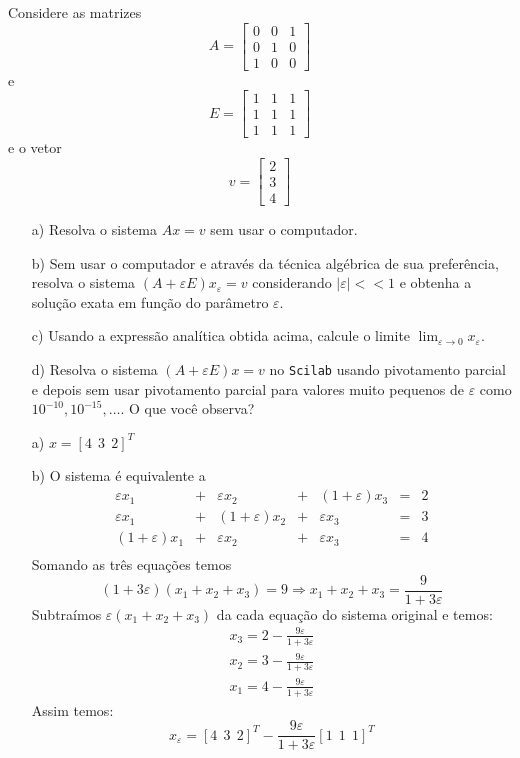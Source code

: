 \ifisscilab
\begin{Exercise} Considere as matrizes
$$A=
\left[
\begin{array}{ccc}
0&0&1\\
0&1&0\\
1&0&0
\end{array}\right]$$
e
$$E=
\left[
\begin{array}{ccc}
1&1&1\\
1&1&1\\
1&1&1
\end{array}\right]$$
e o vetor
$$v=
\left[
\begin{array}{c}
2\\
3\\
4
\end{array}\right]$$
\begin{itemize}
\item[a)] Resolva o sistema $Ax=v$ sem usar o computador.
\item[b)] Sem usar o computador e através da técnica algébrica de sua preferência, resolva o sistema $(A+\varepsilon E)x_\varepsilon=v$ considerando $|\varepsilon|<<1$ e obtenha a solução exata em função do parâmetro $\varepsilon$.
\item[c)] Usando a expressão analítica obtida acima, calcule o limite $\lim_{\varepsilon\to 0} x_\varepsilon $.
\item[d)] Resolva o sistema $(A+\varepsilon E)x=v$ no \verb+Scilab+ usando pivotamento parcial e depois sem usar pivotamento parcial para valores muito pequenos de $\varepsilon$ como $10^{-10}, 10^{-15}, \ldots$. O que você observa?
\end{itemize}
\end{Exercise}
\begin{Answer}
  \begin{tiny}
\begin{itemize}
\item[a)] $x=[4 ~~3 ~~2]^T$

\item[b)] O sistema é equivalente a
$$
\begin{array}{lclclcl}
\varepsilon x_1 &+& \varepsilon x_2 &+&(1+\varepsilon) x_3 &=& 2\\
\varepsilon x_1 &+& (1+\varepsilon) x_2 &+&\varepsilon x_3 &=& 3\\
(1+\varepsilon) x_1 &+& \varepsilon x_2 &+&\varepsilon x_3 &=& 4\\
\end{array}
$$
Somando as três equações temos
$$(1+3\varepsilon)(x_1+x_2+x_3)=9\Longrightarrow x_1+x_2+x_3=\frac{9}{1+3\varepsilon}$$
Subtraímos $\varepsilon(x_1+x_2+x_3)$ da cada equação do sistema original e temos:
$$\begin{array}{l}
x_3=2-\frac{9\varepsilon}{1+3\varepsilon}\\[.4cm]
x_2=3-\frac{9\varepsilon}{1+3\varepsilon}\\[.4cm]
x_1=4-\frac{9\varepsilon}{1+3\varepsilon}
\end{array}
$$
Assim temos:
$$x_{\varepsilon}=\left[4 ~~3 ~~2\right]^T-\frac{9\varepsilon}{1+3\varepsilon}\left[1 ~~1 ~~1\right]^T$$
\end{itemize}
      \end{tiny}
\end{Answer}
